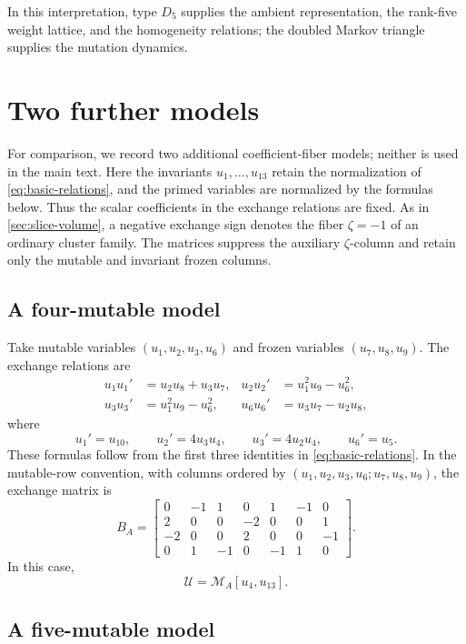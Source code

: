 \documentclass[11pt,reqno]{amsart}
\numberwithin{equation}{section}
\theoremstyle{remark}
\newcommand{\UR}{\mathscr U}
\begin{document}
In this interpretation, type $D_5$ supplies the ambient representation, the
rank-five weight lattice, and the homogeneity relations; the doubled Markov
triangle supplies the mutation dynamics.

\section{Two further models}
\label{app:other-models}

For comparison, we record two additional coefficient-fiber models; neither is
used in the main text.  Here the invariants $u_1,\ldots,u_{13}$ retain the
normalization of \eqref{eq:basic-relations}, and the primed variables are
normalized by the formulas below.  Thus the scalar coefficients in the
exchange relations are fixed.  As in \cref{sec:slice-volume}, a negative
exchange sign denotes the fiber $\zeta=-1$ of an ordinary cluster family.
The matrices suppress the auxiliary $\zeta$-column and retain only the
mutable and invariant frozen columns.

\subsection{A four-mutable model}

Take mutable variables $(u_1,u_2,u_3,u_6)$ and frozen variables
$(u_7,u_8,u_9)$.  The exchange relations are
\begin{align*}
 u_1u_1'&=u_2u_8+u_3u_7,
 &u_2u_2'&=u_1^2u_9-u_6^2,\\
 u_3u_3'&=u_1^2u_9-u_6^2,
 &u_6u_6'&=u_3u_7-u_2u_8,
\end{align*}
where
\[ u_1'=u_{10},\qquad u_2'=4u_3u_4,\qquad u_3'=4u_2u_4,\qquad u_6'=u_5. \]
These formulas follow from the first three identities in
\eqref{eq:basic-relations}.  In the mutable-row convention, with columns ordered
by $(u_1,u_2,u_3,u_6;u_7,u_8,u_9)$, the exchange matrix is
\[
 B_A=
 \begin{bmatrix}
 0&-1& 1& 0& 1&-1& 0\\
 2& 0& 0&-2& 0& 0& 1\\
-2& 0& 0& 2& 0& 0&-1\\
 0& 1&-1& 0&-1& 1& 0
 \end{bmatrix}.
\]
In this case, 
\[ \UR=\mathcal M_A[u_4,u_{13}]. \]

\subsection{A five-mutable model}
\end{document}
